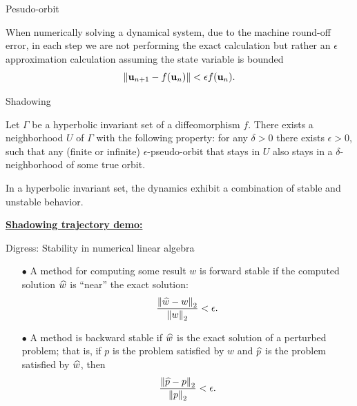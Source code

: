 \documentclass{beamer}
\begin{document}
\begin{frame}{Pesudo-orbit}
	\begin{example}
		When numerically solving a dynamical system, due to the machine round-off error,
		in each step we are not performing the exact calculation but rather an $\epsilon$ approximation
		calculation assuming the state variable is bounded
		\begin{equation}
			\left\| \mathbf{u}_{n+1} - f(\mathbf{u}_n) \right\| < \epsilon f(\mathbf{u}_n).
		\end{equation}
	\end{example}
\end{frame}

\begin{frame}{Shadowing}
	\begin{theorem}
		Let $\Gamma$ be a hyperbolic invariant set of a diffeomorphism $f$. There exists a 
		neighborhood $U$ of $\Gamma$ with the following property: for any $\delta > 0$ there 
		exists $\epsilon > 0$, such that any (finite or infinite) $\epsilon$-pseudo-orbit that 
		stays in $U$ also stays in a $\delta$-neighborhood of some true orbit\footnotemark.
	\end{theorem}
	In a hyperbolic invariant set, the dynamics exhibit a combination of stable and unstable behavior.

	\href{https://www.youtube.com/watch?v=07jkQ1ox7vI&t=290s}{\textbf{Shadowing trajectory demo:}}
\end{frame}

\begin{frame}{Digress: Stability in numerical linear algebra}
	\begin{itemize}
		\item[$\bullet$] A method for computing some result $w$ is forward stable if the computed solution $\widehat w$
		is ``near'' the exact solution: 
		\begin{equation}
			\frac{\left\| \widehat w - w \right\|_2}{\left\| w \right\|_2} < \epsilon.
		\end{equation}
		\item[$\bullet$] A method is backward stable if $\widehat w$ is the exact solution of a perturbed problem; 
		that is, if $p$ is the problem satisfied by $w$ and $\widehat p$ is the problem satisfied by $\widehat w$, then 
		\begin{equation}
			\frac{\left\| \widehat p - p \right\|_2}{\left\| p \right\|_2} < \epsilon.
		\end{equation}
	\end{itemize}
\end{frame}
\end{document}
